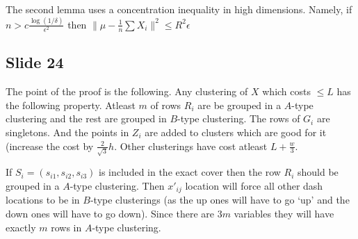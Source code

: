 \documentclass[12pt]{article}
\begin{document}
The second lemma uses a concentration inequality in high dimensions. Namely, if $n > c\frac{\log (1/\delta)}{\epsilon^2}$ then $\|\mu - \frac{1}{n}\sum X_i\|^2 \le R^2 \epsilon$ 

\subsection*{Slide 24}
The point of the proof is the following. Any clustering of $X$ which costs $\le L$ has the following property. Atleast $m$ of rows $R_i$ are be grouped in a $A$-type clustering and the rest are grouped in $B$-type clustering. The rows of $G_i$ are singletons. And the points in $Z_i$ are added to clusters which are good for it (increase the cost by $\frac{2}{\sqrt{3}}h$. Other clusterings have cost atleast $L + \frac{w}{3}$. 

If $S_i = (s_{i1}, s_{i2}, s_{i3})$ is included in the exact cover then the row $R_i$ should be grouped in a $A$-type clustering. Then $x'_{ij}$ location will force all other dash locations to be in $B$-type clusterings (as the up ones will have to go `up' and the down ones will have to go down). Since there are $3m$ variables they will have exactly $m$ rows in $A$-type clustering. 
\end{document}
